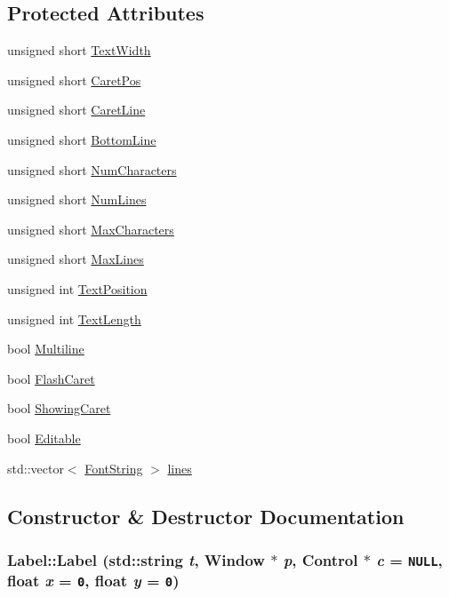 \subsection*{Protected Attributes}
\begin{CompactItemize}
\item 
unsigned short \hyperlink{class_label_ad85ba57f87b6a659bcb1e3af683eefc}{TextWidth}
\item 
unsigned short \hyperlink{class_label_94b3f7d3f2fbd73994096c5e37933168}{CaretPos}
\item 
unsigned short \hyperlink{class_label_7163c9d05660995a186b0b307fb8666e}{CaretLine}
\item 
unsigned short \hyperlink{class_label_75bcf9a2e388edd745b36d7eb64af80d}{BottomLine}
\item 
unsigned short \hyperlink{class_label_3a498842ed53d551bf450d1d33f0ba0a}{NumCharacters}
\item 
unsigned short \hyperlink{class_label_e33c7af25f54266e74d198e28760fd96}{NumLines}
\item 
unsigned short \hyperlink{class_label_0c06aa6847a50b66c54cc835cac02db7}{MaxCharacters}
\item 
unsigned short \hyperlink{class_label_aae699cb964f77eae188ca43b07597a8}{MaxLines}
\item 
unsigned int \hyperlink{class_label_72c3186c4435a5246c3e400ac325108c}{TextPosition}
\item 
unsigned int \hyperlink{class_label_2e14d5c447f9eb5a2cb541053c3a46e0}{TextLength}
\item 
bool \hyperlink{class_label_3899d1c5cf532dea0ba6a2cee3f1e39a}{Multiline}
\item 
bool \hyperlink{class_label_90c72b251f2db4a56fe64d29c2ff8247}{FlashCaret}
\item 
bool \hyperlink{class_label_f8ad98a48a3e5e8e9604e3ee87821f0e}{ShowingCaret}
\item 
bool \hyperlink{class_label_6c00ea894a9a737523c86c8b3a947026}{Editable}
\item 
std::vector$<$ \hyperlink{struct_font_string}{FontString} $>$ \hyperlink{class_label_19bbe1a32bed5a975676e0b0e2241209}{lines}
\end{CompactItemize}


\subsection{Constructor \& Destructor Documentation}
\hypertarget{class_label_f18c93c34ae5c24d8fc851c6c8d3ce14}{
\subsubsection[{Label}]{\setlength{\rightskip}{0pt plus 5cm}Label::Label (std::string {\em t}, \/  {\bf Window} $\ast$ {\em p}, \/  {\bf Control} $\ast$ {\em c} = {\tt NULL}, \/  float {\em x} = {\tt 0}, \/  float {\em y} = {\tt 0})}}
\label{class_label_f18c93c34ae5c24d8fc851c6c8d3ce14}


